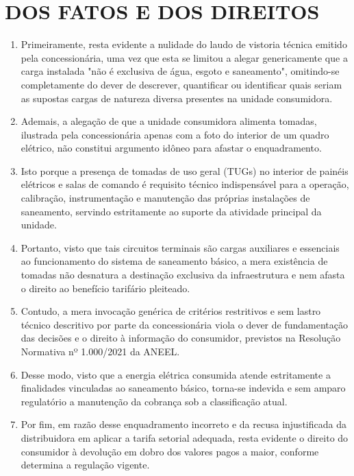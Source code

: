 \newcommand{\tipoRequerimento}{cobrança indevida sobre enquadramento tarifário incorreto}
\newcommand{\tese}{}

\section{DOS FATOS E DOS DIREITOS}

\begin{enumerate}[resume]
    \item Primeiramente, resta evidente a nulidade do laudo de vistoria técnica emitido pela concessionária, uma vez que esta se limitou a alegar genericamente que a carga instalada "não é exclusiva de água, esgoto e saneamento", omitindo-se completamente do dever de descrever, quantificar ou identificar quais seriam as supostas cargas de natureza diversa presentes na unidade consumidora.
    
    \item Ademais, a alegação de que a unidade consumidora alimenta tomadas, ilustrada pela concessionária apenas com a foto do interior de um quadro elétrico, não constitui argumento idôneo para afastar o enquadramento.
    
    \item Isto porque a presença de tomadas de uso geral (TUGs) no interior de painéis elétricos e salas de comando é requisito técnico indispensável para a operação, calibração, instrumentação e manutenção das próprias instalações de saneamento, servindo estritamente ao suporte da atividade principal da unidade.
    
    \item Portanto, visto que tais circuitos terminais são cargas auxiliares e essenciais ao funcionamento do sistema de saneamento básico, a mera existência de tomadas não desnatura a destinação exclusiva da infraestrutura e nem afasta o direito ao benefício tarifário pleiteado.
    
    \item Contudo, a mera invocação genérica de critérios restritivos e sem lastro técnico descritivo por parte da concessionária viola o dever de fundamentação das decisões e o direito à informação do consumidor, previstos na Resolução Normativa nº 1.000/2021 da ANEEL.
    
    \item Desse modo, visto que a energia elétrica consumida atende estritamente a finalidades vinculadas ao saneamento básico, torna-se indevida e sem amparo regulatório a manutenção da cobrança sob a classificação atual.
    
    \item Por fim, em razão desse enquadramento incorreto e da recusa injustificada da distribuidora em aplicar a tarifa setorial adequada, resta evidente o direito do consumidor à devolução em dobro dos valores pagos a maior, conforme determina a regulação vigente.
\end{enumerate}

